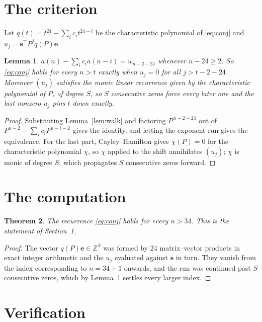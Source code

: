 \documentclass[11pt,a4paper]{article}
\theoremstyle{plain}
\newtheorem{theorem}{Theorem}
\newtheorem{lemma}[theorem]{Lemma}
\theoremstyle{definition}
\begin{document}
\section{The criterion}

Let $q(t)=t^{24}-\sum_i c_i t^{24-i}$ be the characteristic polynomial of
\eqref{eq:conj} and $u_j=\mathbf{s}^{\!\top}P^{j}q(P)\mathbf{e}$.

\begin{lemma}\label{lem:crit}
$a(n)-\sum_i c_i a(n-i)=u_{\,n-2-24}$ whenever $n-24\ge2$. So \eqref{eq:conj}
holds for every $n>t$ exactly when $u_j=0$ for all $j>t-2-24$. Moreover $(u_j)$
satisfies the monic linear recurrence given by the characteristic polynomial of $P$, of
degree $S$, so $S$ consecutive zeros force every later one and the last nonzero $u_j$ pins
$t$ down exactly.
\end{lemma}

\begin{proof}
Substituting Lemma~\ref{lem:walk} and factoring $P^{\,n-2-24}$ out of
$P^{n-2}-\sum_i c_i P^{n-i-2}$ gives the identity, and letting the exponent run gives the
equivalence. For the last part, Cayley--Hamilton gives $\chi(P)=0$ for the characteristic
polynomial $\chi$, so $\chi$ applied to the shift annihilates $(u_j)$; $\chi$ is monic of
degree $S$, which propagates $S$ consecutive zeros forward.
\end{proof}

\section{The computation}

\begin{theorem}
The recurrence \eqref{eq:conj} holds for every $n>34$. This is the statement of
Section~1.
\end{theorem}

\begin{proof}
The vector $q(P)\mathbf{e}\in\mathbb{Z}^{S}$ was formed by $24$ matrix--vector
products in exact integer arithmetic and the $u_j$ evaluated against $\mathbf{s}$ in turn.
They vanish from the index corresponding to $n=34+1$ onwards, and the run was continued
past $S$ consecutive zeros, which by Lemma~\ref{lem:crit} settles every larger index.
\end{proof}

\section{Verification}
\end{document}
